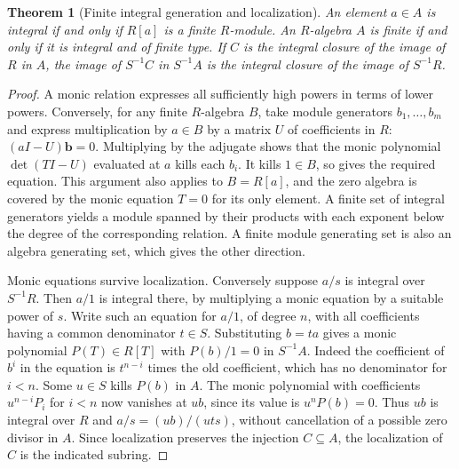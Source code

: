\documentclass[11pt,oneside,openany]{book}
\newtheorem{theorem}{Theorem}[chapter]
\theoremstyle{definition}
\theoremstyle{remark}
\begin{document}
\begin{theorem}[Finite integral generation and localization]\label{p103:ALG-05-C01-S03}
An element \(a\in A\) is integral if and only if \(R[a]\) is a finite \(R\)-module. An \(R\)-algebra \(A\) is finite if and only if it is integral and of finite type. If \(C\) is the integral closure of the image of \(R\) in \(A\), the image of \(S^{-1}C\) in \(S^{-1}A\) is the integral closure of the image of \(S^{-1}R\).
\end{theorem}
\begin{proof}
A monic relation expresses all sufficiently high powers in terms of lower powers. Conversely, for any finite \(R\)-algebra \(B\), take module generators \(b_1,\ldots,b_m\) and express multiplication by \(a\in B\) by a matrix \(U\) of coefficients in \(R\): \((aI-U)\mathbf b=0\). Multiplying by the adjugate shows that the monic polynomial \(\det(TI-U)\) evaluated at \(a\) kills each \(b_i\). It kills \(1\in B\), so gives the required equation. This argument also applies to \(B=R[a]\), and the zero algebra is covered by the monic equation \(T=0\) for its only element. A finite set of integral generators yields a module spanned by their products with each exponent below the degree of the corresponding relation. A finite module generating set is also an algebra generating set, which gives the other direction.

Monic equations survive localization. Conversely suppose \(a/s\) is integral over \(S^{-1}R\). Then \(a/1\) is integral there, by multiplying a monic equation by a suitable power of \(s\). Write such an equation for \(a/1\), of degree \(n\), with all coefficients having a common denominator \(t\in S\). Substituting \(b=ta\) gives a monic polynomial \(P(T)\in R[T]\) with \(P(b)/1=0\) in \(S^{-1}A\). Indeed the coefficient of \(b^i\) in the equation is \(t^{n-i}\) times the old coefficient, which has no denominator for \(i<n\). Some \(u\in S\) kills \(P(b)\) in \(A\). The monic polynomial with coefficients \(u^{n-i}P_i\) for \(i<n\) now vanishes at \(ub\), since its value is \(u^nP(b)=0\). Thus \(ub\) is integral over \(R\) and \(a/s=(ub)/(uts)\), without cancellation of a possible zero divisor in \(A\). Since localization preserves the injection \(C\subseteq A\), the localization of \(C\) is the indicated subring.
\end{proof}
\end{document}
